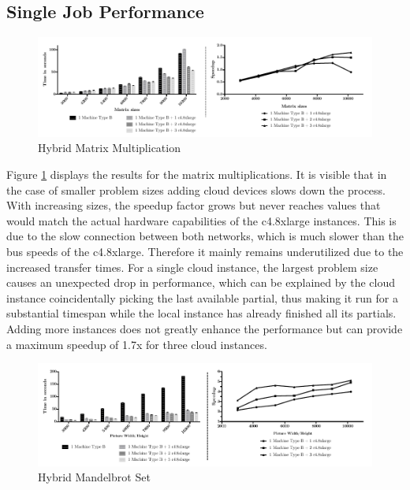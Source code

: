 \subsection*{Single Job Performance}

\begin{figure}[!htb]
	\includegraphics[width=1.0\textwidth]{images/hybrid_matrix_multiplication.pdf}
	\centering
	\caption{Hybrid Matrix Multiplication}
	\label{img:hybrid_matrix_multiplication}
\end{figure}

Figure \ref{img:hybrid_matrix_multiplication} displays the results for the matrix multiplications. It is visible that in the case of smaller problem sizes adding cloud devices slows down the process. With increasing sizes, the speedup factor grows but never reaches values that would match the actual hardware capabilities of the c4.8xlarge instances. This is due to the slow connection between both networks, which is much slower than the bus speeds of the c4.8xlarge. Therefore it mainly remains underutilized due to the increased transfer times. For a single cloud instance, the largest problem size causes an unexpected drop in performance, which can be explained by the cloud instance coincidentally picking the last available partial, thus making it run for a substantial timespan while the local instance has already finished all its partials. Adding more instances does not greatly enhance the performance but can provide a maximum speedup of 1.7x for three cloud instances.


\begin{figure}[!htb]
	\includegraphics[width=1.0\textwidth]{images/hybrid_mandelbrot_performance.pdf}
	\centering
	\caption{Hybrid Mandelbrot Set}
	\label{img:hybrid_mandelbrot}
\end{figure}

